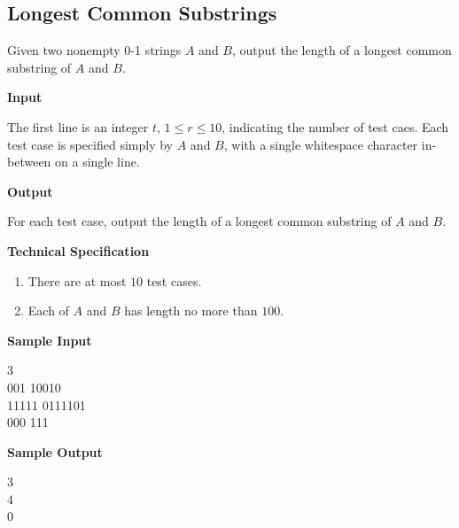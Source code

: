 \subsection{Longest Common Substrings}
Given two nonempty 0-1 strings $A$ and $B$, output the length of a longest common substring of $A$ and $B$.

\begin{flushleft}
{\color{red} \textbf{Input}}
\end{flushleft}
The first line is an integer $t$, $1 \leq r \leq 10$, indicating the number of test caes. Each test case is specified simply by $A$ and $B$, with a single whitespace character in-between on a single line.

\begin{flushleft}
{\color{red} \textbf{Output}}
\end{flushleft}
For each test case, output the length of a longest common substring of $A$ and $B$.

\begin{flushleft}
{\color{red} \textbf{Technical Specification}}
\end{flushleft}
\begin{enumerate}
\item There are at most $10$ test cases.
\item Each of $A$ and $B$ has length no more than $100$.
\end{enumerate}

\begin{flushleft}
{\color{red} \textbf{Sample Input}}
\end{flushleft}
\begin{flushleft}
3\\
001 10010\\
11111 0111101\\
000 111\\
\end{flushleft}

\begin{flushleft}
{\color{red} \textbf{Sample Output}}
\end{flushleft}
\begin{flushleft}
3\\
4\\
0\\
\end{flushleft}

\newpage